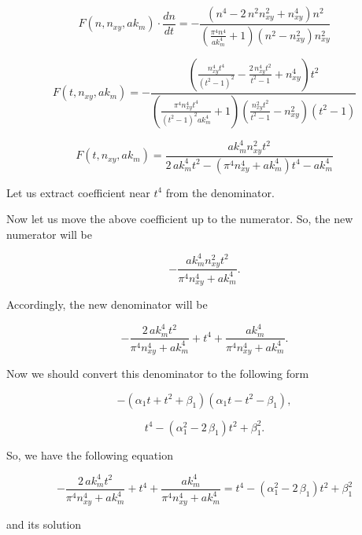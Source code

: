 \documentclass[twoside, 10pt, ptm]{article}
\begin{document}
\begin{multicols}{2}
\[F\left(n, n_{xy}, ak_m\right) \cdot \frac{dn}{dt} = -\frac{{\left(n^{4} - 2 \, n^{2} n_{\mathit{xy}}^{2} + n_{\mathit{xy}}^{4}\right)} n^{2}}{{\left(\frac{\pi^{4} n^{4}}{\mathit{ak}_{m}^{4}} + 1\right)} {\left(n^{2} - n_{\mathit{xy}}^{2}\right)} n_{\mathit{xy}}^{2}}\]

\[F\left(t, n_{xy}, ak_m\right) = -\frac{{\left(\frac{n_{\mathit{xy}}^{4} t^{4}}{{\left(t^{2} - 1\right)}^{2}} - \frac{2 \, n_{\mathit{xy}}^{4} t^{2}}{t^{2} - 1} + n_{\mathit{xy}}^{4}\right)} t^{2}}{{\left(\frac{\pi^{4} n_{\mathit{xy}}^{4} t^{4}}{{\left(t^{2} - 1\right)}^{2} \mathit{ak}_{m}^{4}} + 1\right)} {\left(\frac{n_{\mathit{xy}}^{2} t^{2}}{t^{2} - 1} - n_{\mathit{xy}}^{2}\right)} {\left(t^{2} - 1\right)}}\]

\[F\left(t, n_{xy}, ak_m\right) = \frac{\mathit{ak}_{m}^{4} n_{\mathit{xy}}^{2} t^{2}}{2 \, \mathit{ak}_{m}^{4} t^{2} - {\left(\pi^{4} n_{\mathit{xy}}^{4} + \mathit{ak}_{m}^{4}\right)} t^{4} - \mathit{ak}_{m}^{4}}\]

    Let us extract coefficient near \(t^4\) from the denominator.

    Now let us move the above coefficient up to the numerator. So, the new
numerator will be

    \[-\frac{\mathit{ak}_{m}^{4} n_{\mathit{xy}}^{2} t^{2}}{\pi^{4} n_{\mathit{xy}}^{4} + \mathit{ak}_{m}^{4}}.\]

    Accordingly, the new denominator will be

    \[-\frac{2 \, \mathit{ak}_{m}^{4} t^{2}}{\pi^{4} n_{\mathit{xy}}^{4} + \mathit{ak}_{m}^{4}} + t^{4} + \frac{\mathit{ak}_{m}^{4}}{\pi^{4} n_{\mathit{xy}}^{4} + \mathit{ak}_{m}^{4}}.\]

    Now we should convert this denominator to the following form

    \[-{\left(\alpha_{1} t + t^{2} + \beta_{1}\right)} {\left(\alpha_{1} t - t^{2} - \beta_{1}\right)},\]

\[t^{4} - {\left(\alpha_{1}^{2} - 2 \, \beta_{1}\right)} t^{2} + \beta_{1}^{2}.\]


    So, we have the following equation

\[-\frac{2 \, \mathit{ak}_{m}^{4} t^{2}}{\pi^{4} n_{\mathit{xy}}^{4} + \mathit{ak}_{m}^{4}} + t^{4} + \frac{\mathit{ak}_{m}^{4}}{\pi^{4} n_{\mathit{xy}}^{4} + \mathit{ak}_{m}^{4}} = t^{4} - {\left(\alpha_{1}^{2} - 2 \, \beta_{1}\right)} t^{2} + \beta_{1}^{2}\]

and its solution


\end{multicols}
\end{document}
